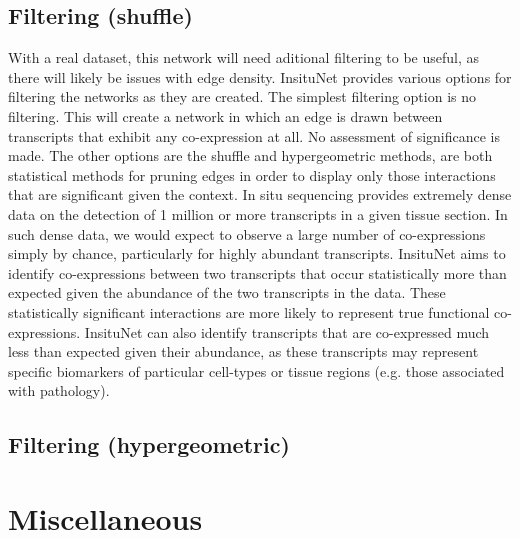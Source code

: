 \documentclass[a4paper,12pt]{article}
\begin{document}
\subsection{Filtering (shuffle)}
With a real dataset, this network will need aditional filtering to be useful, as there will likely be issues with edge density. InsituNet provides various options for filtering the networks as they are created. The simplest filtering option is no filtering. This will create a network in which an edge is drawn between transcripts that exhibit any co-expression at all. No assessment of significance is made. The other options are the shuffle and hypergeometric methods, are both statistical methods for pruning edges in order to display only those interactions that are significant given the context.
In situ sequencing provides extremely dense data on the detection of 1 million or more transcripts in a given tissue section. In such dense data, we would expect to observe a large number of co-expressions simply by chance, particularly for highly abundant transcripts. InsituNet aims to identify co-expressions between two transcripts that occur statistically more than expected given the abundance of the two transcripts in the data. These statistically significant interactions are more likely to represent true functional co-expressions. InsituNet can also identify transcripts that are co-expressed much less than expected given their abundance, as these transcripts may represent specific biomarkers of particular cell-types or tissue regions (e.g. those associated with pathology).
\subsection{Filtering (hypergeometric)}

\section{Miscellaneous}
\end{document}
